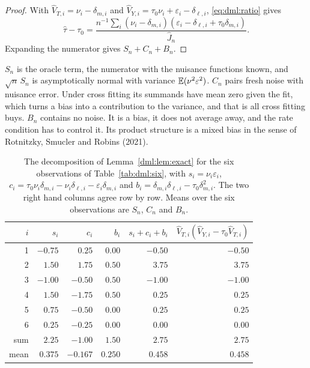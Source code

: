 \begin{proof}
With $\hat V_{T,i} = \nu_i - \delta_{m,i}$ and $\hat V_{Y,i} = \tau_0\nu_i + \varepsilon_i - \delta_{\ell,i}$, \eqref{eq:dml:ratio} gives
\[
\hat\tau - \tau_0 = \frac{n^{-1}\sum_i(\nu_i - \delta_{m,i})(\varepsilon_i - \delta_{\ell,i} + \tau_0\delta_{m,i})}{\hat J_n}.
\]
Expanding the numerator gives $S_n + C_n + B_n$.
\end{proof}

$S_n$ is the oracle term, the numerator with the nuisance functions known, and $\sqrt{n}\,S_n$ is asymptotically normal with variance $\mathbb{E}(\nu^2\varepsilon^2)$. $C_n$ pairs fresh noise with nuisance error. Under cross fitting its summands have mean zero given the fit, which turns a bias into a contribution to the variance, and that is all cross fitting buys. $B_n$ contains no noise. It is a bias, it does not average away, and the rate condition has to control it. Its product structure is a mixed bias in the sense of Rotnitzky, Smucler and Robins (2021).

\begin{table}[ht]
\centering
\caption{The decomposition of Lemma~\ref{dml:lem:exact} for the six observations of Table~\ref{tab:dml:six}, with $s_i = \nu_i\varepsilon_i$, $c_i = \tau_0\nu_i\delta_{m,i} - \nu_i\delta_{\ell,i} - \varepsilon_i\delta_{m,i}$ and $b_i = \delta_{m,i}\delta_{\ell,i} - \tau_0\delta_{m,i}^2$. The two right hand columns agree row by row. Means over the six observations are $S_n$, $C_n$ and $B_n$.}
\label{tab:dml:decomp}
\small
\begin{tabular}{rrrrrr}
\toprule
$i$ & $s_i$ & $c_i$ & $b_i$ & $s_i + c_i + b_i$ & $\hat V_{T,i}(\hat V_{Y,i} - \tau_0\hat V_{T,i})$ \\
\midrule
1 & $-0.75$ & $0.25$ & $0.00$ & $-0.50$ & $-0.50$ \\
2 & $1.50$ & $1.75$ & $0.50$ & $3.75$ & $3.75$ \\
3 & $-1.00$ & $-0.50$ & $0.50$ & $-1.00$ & $-1.00$ \\
4 & $1.50$ & $-1.75$ & $0.50$ & $0.25$ & $0.25$ \\
5 & $0.75$ & $-0.50$ & $0.00$ & $0.25$ & $0.25$ \\
6 & $0.25$ & $-0.25$ & $0.00$ & $0.00$ & $0.00$ \\
\midrule
sum & $2.25$ & $-1.00$ & $1.50$ & $2.75$ & $2.75$ \\
mean & $0.375$ & $-0.167$ & $0.250$ & $0.458$ & $0.458$ \\
\bottomrule
\end{tabular}
\end{table}

